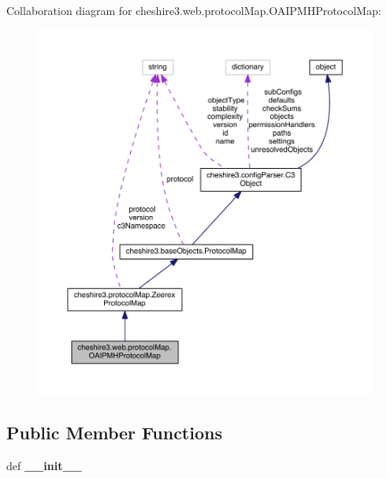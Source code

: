 Collaboration diagram for cheshire3.\-web.\-protocol\-Map.\-O\-A\-I\-P\-M\-H\-Protocol\-Map\-:
\nopagebreak
\begin{figure}[H]
\begin{center}
\leavevmode
\includegraphics[width=350pt]{classcheshire3_1_1web_1_1protocol_map_1_1_o_a_i_p_m_h_protocol_map__coll__graph}
\end{center}
\end{figure}
\subsection*{Public Member Functions}
\begin{DoxyCompactItemize}
\item 
\hypertarget{classcheshire3_1_1web_1_1protocol_map_1_1_o_a_i_p_m_h_protocol_map_ac61740c70fa618f49e3560834226a458}{def {\bfseries \-\_\-\-\_\-init\-\_\-\-\_\-}}\label{classcheshire3_1_1web_1_1protocol_map_1_1_o_a_i_p_m_h_protocol_map_ac61740c70fa618f49e3560834226a458}

\end{DoxyCompactItemize}

